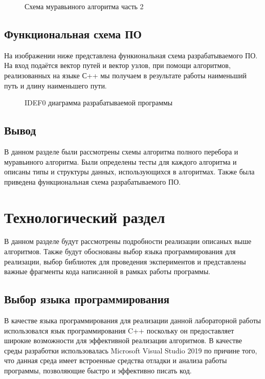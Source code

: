 \newpage

\begin{figure}[ph!]
	\caption{Схема муравьиного алгоритма часть 2}
\end{figure}

\newpage

\section{Функциональная схема ПО}
На изображении ниже представлена функиональная схема разрабатываемого ПО. На вход подаётся вектор путей и вектор узлов, при помощи алгоритмов, реализованных на языке С++ мы получаем в результате работы наименьший путь и длину наименьшего пути.

\begin{figure}[ph!]
	\caption{IDEF0 диаграмма разрабатываемой программы}
\end{figure}

\section{Вывод}
В данном разделе были рассмотрены схемы алгоритма полного перебора и муравьиного алгоритма. Были определены тесты для каждого алгоритма и описаны типы и структуры данных, использующихся в алгоритмах. Также была приведена функциональная схема разрабатываемого ПО.

\chapter{Технологический раздел}

В данном разделе будут рассмотрены подробности реализации описаных выше алгоритмов. Также будут обоснованы выбор языка программирования для реализации, выбор библиотек для проведения экспериментов и представлены важные фрагменты кода написанной в рамках работы программы.

\section{Выбор языка программирования}

В качестве языка программирования для реализации данной лабораторной работы использовался язык программирования C++ поскольку он предоставляет широкие возможности для эффективной реализации алгоритмов. В качестве среды разработки использовалась Microsoft Visual Studio 2019 по причине того, что данная среда имеет встроенные средства отладки и анализа работы программы, позволяющие быстро и эффективно писать код.

